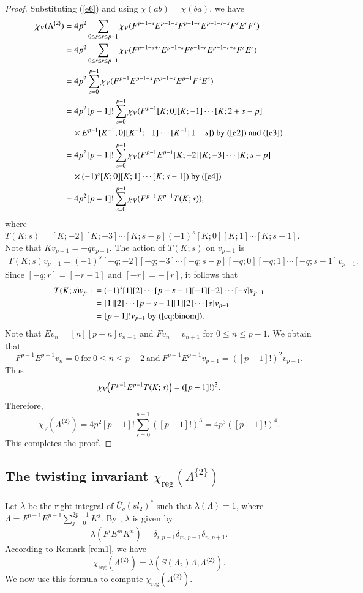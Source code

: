 \documentclass[11pt]{amsart}
\numberwithin{equation}{section}
\begin{document}
\begin{proof}
Substituting (\ref{e6}) and using $\chi(ab)=\chi(ba)$, we have
\begin{align*}
\chi_V(\Lambda^{\{2\}})&=4p^2\sum_{0\leq s\leq r \leq p-1}\chi_V(F^{p-1-s}E^{p-1-s}F^{p-1-r}E^{p-1-r+s}F^sE^rF^r)\\
&=4p^2\sum_{0\leq s\leq r \leq p-1}\chi_V(F^{p-1-s+r}E^{p-1-s}F^{p-1-r}E^{p-1-r+s}F^sE^r)\\
&=4p^2\sum_{s=0}^{p-1}\chi_V(F^{p-1}E^{p-1-s}F^{p-1-s}E^{p-1}F^sE^s)\\
&=4p^2[p-1]!\sum_{s=0}^{p-1}\chi_V(F^{p-1}[K;0][K;-1]\cdots[K;2+s-p]\\
&\quad \times E^{p-1}[K^{-1};0][K^{-1};-1]\cdots[K^{-1};1-s])\ \text{by}\ (\ref{e2})\ \text{and}\  (\ref{e3}) \\  
&=4p^2[p-1]!\sum_{s=0}^{p-1}\chi_V(F^{p-1}E^{p-1}[K;-2][K;-3]\cdots[K;s-p]\\
&\quad \times (-1)^s[K;0][K;1]\cdots[K;s-1])\ \text{by}\ (\ref{e4})\\
&=4p^2[p-1]!\sum_{s=0}^{p-1}\chi_V(F^{p-1}E^{p-1}T(K;s)),
\end{align*}
where $T(K;s)=[K;-2][K;-3]\cdots[K;s-p](-1)^s[K;0][K;1]\cdots[K;s-1]$. Note that $K v_{p-1}= -q v_{p-1}.$ The action of $T(K;s)$ on $v_{p-1}$ is
\begin{align*}
T(K;s)v_{p-1}=(-1)^s[-q;-2][-q;-3]\cdots[-q;s-p][-q;0][-q;1]\cdots[-q;s-1]v_{p-1}.
\end{align*}
Since $[-q;r]=[-r-1]$ and $[-r]=-[r]$, it follows that
\begin{align*}
T(K;s)v_{p-1}&=(-1)^s[1][2]\cdots[p-s-1][-1][-2]\cdots[-s]v_{p-1}\\
&=[1][2]\cdots[p-s-1][1][2]\cdots[s]v_{p-1}\\
&=[p-1]!v_{p-1}\ \text{by}\ (\ref{eq:binom}).
\end{align*}
Note that $E v_n = [n][p-n] v_{n-1}$ and
$F v_n = v_{n+1}$ for $0\leq n\leq p-1$. We obtain that
$$F^{p-1}E^{p-1}v_n=0\ \text{for}\  0\leq n\leq p-2\ \text{and}\ F^{p-1}E^{p-1}v_{p-1}=([p-1]!)^2v_{p-1}.$$ 
Thus
\[
\chi_V\Bigl( F^{p-1}E^{p-1}T(K;s)\Bigr)
=([p-1]!)^3.
\]
Therefore,
\[
\chi_V(\Lambda^{\{2\}})
=4p^2[p-1]!\sum_{s=0}^{p-1}([p-1]!)^3
=4p^3 ([p-1]!)^4.
\]
This completes the proof. 
\end{proof}

\subsection{The twisting invariant $\chi_{\operatorname{reg}}(\Lambda^{\{2\}})$}
Let $\lambda$ be the right integral of $\overline{U}_q(sl_2)^*$ such that $\lambda(\Lambda)=1$, where $\Lambda=F^{p-1}E^{p-1}\sum_{j=0}^{2p-1}K^{j}.$ By \cite[Sec.3.1.2]{FGST}, $\lambda$ is given by \begin{equation}\label{e9}
\lambda(F^iE^mK^n)=\delta_{i,p-1}\delta_{m,p-1}\delta_{n,p+1}.\end{equation}
According to Remark \ref{rem1}, we have
\[
\chi_{\operatorname{reg}}(\Lambda^{\{2\}})=\lambda(S(\Lambda_2)\Lambda_1\Lambda^{\{2\}}).
\]
We now use this formula to compute $\chi_{\operatorname{reg}}(\Lambda^{\{2\}})$.
\end{document}
